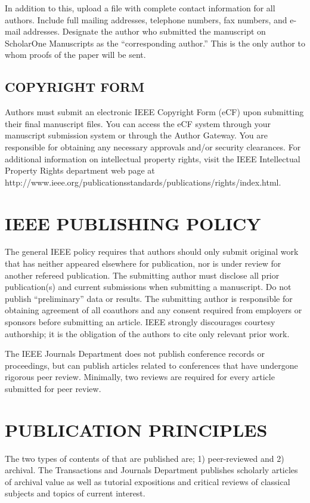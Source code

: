 \documentclass{IEEEoj-data}
\begin{document}
{In addition to this, upload a file with complete contact information for all 
authors. Include full mailing addresses, telephone numbers, fax numbers, and 
e-mail addresses. Designate the author who submitted the manuscript on 
ScholarOne Manuscripts as the ``corresponding author.'' This is the only 
author to whom proofs of the paper will be sent. 

\subsection*{COPYRIGHT FORM}
Authors must submit an electronic IEEE Copyright Form (eCF) upon submitting 
their final manuscript files. You can access the eCF system through your 
manuscript submission system or through the Author Gateway. You are 
responsible for obtaining any necessary approvals and/or security 
clearances. For additional information on intellectual property rights, 
visit the IEEE Intellectual Property Rights department web page at 
http://www.ieee.org/publications\textunderscore\discretionary{}{}{}standards/publications/rights/index.html. 

\section*{IEEE PUBLISHING POLICY}
The general IEEE policy requires that authors should only submit original 
work that has neither appeared elsewhere for publication, nor is under 
review for another refereed publication. The submitting author must disclose 
all prior publication(s) and current submissions when submitting a 
manuscript. Do not publish ``preliminary'' data or results. The submitting 
author is responsible for obtaining agreement of all coauthors and any 
consent required from employers or sponsors before submitting an article. 
IEEE strongly discourages courtesy authorship; 
it is the obligation of the authors to cite only relevant prior work.

The IEEE Journals Department does not publish conference records or 
proceedings, but can publish articles related to conferences that have 
undergone rigorous peer review. Minimally, two reviews are required for 
every article submitted for peer review.

\section*{PUBLICATION PRINCIPLES}
The two types of contents of that are published are; 1) peer-reviewed and 2) 
archival. The Transactions and Journals Department publishes scholarly 
articles of archival value as well as tutorial expositions and critical 
reviews of classical subjects and topics of current interest. 

}
\end{document}
